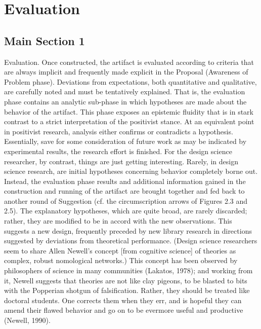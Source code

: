 
\chapter{Evaluation} %

\label{ChapterEvaluation} %


\section{Main Section 1}

Evaluation. Once constructed, the artifact is evaluated according to criteria that are always implicit and frequently made explicit in the Proposal (Awareness of Problem phase). Deviations from expectations, both quantitative and qualitative, are carefully noted and must be tentatively explained. That is, the evaluation phase contains an analytic sub-phase in which hypotheses are made about the behavior of the artifact. This phase exposes an epistemic fluidity that is in stark contrast to a strict interpretation of the positivist stance. At an equivalent point in positivist research, analysis either confirms or contradicts a hypothesis. Essentially, save for some consideration of future work as may be indicated by experimental results, the research effort is finished. For the design science researcher, by contrast, things are just getting interesting. Rarely, in design science research, are initial hypotheses concerning behavior completely borne out. Instead, the evaluation phase results and additional information gained in the construction and running of the artifact are brought together and fed back to another round of Suggestion (cf. the circumscription arrows of Figures 2.3 and 2.5). The explanatory hypotheses, which are quite broad, are rarely discarded; rather, they are modified to be in accord with the new observations. This suggests a new design, frequently preceded by new library research in directions suggested by deviations from theoretical performance. (Design science researchers seem to share Allen Newell’s concept [from cognitive science] of theories as complex, robust nomological networks.) This concept has been observed by philosophers of science in many communities (Lakatos, 1978); and working from it, Newell suggests that theories are not like clay pigeons, to be blasted to bits with the Popperian shotgun of falsification. Rather, they should be treated like doctoral students. One corrects them when they err, and is hopeful they can amend their flawed behavior and go on to be evermore useful and productive (Newell, 1990).
\cite{Vaishnavi2008}

